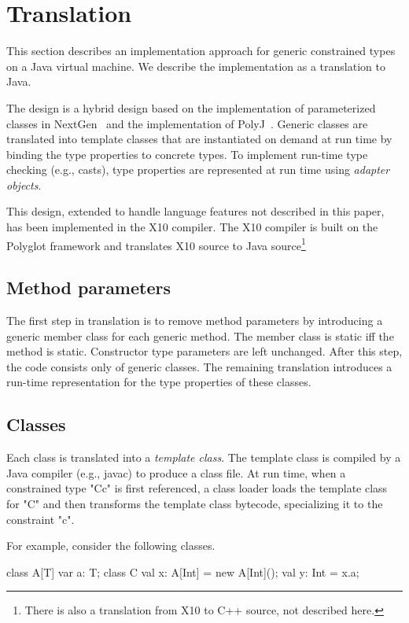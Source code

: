 \documentclass[preprint,nocopyrightspace,9pt]{sigplanconf}
\begin{document}
\section{Translation}

This section describes an implementation approach for
generic constrained types on a Java virtual machine.
We describe the implementation as a translation to Java.

The design
is a hybrid design based on the implementation of parameterized classes in
NextGen~\cite{allen03,allen04} and the implementation of
PolyJ~\cite{polyj}.
Generic classes are translated into template classes
that are instantiated on demand at run time by binding the type properties
to concrete types.  To implement run-time type checking (e.g.,
casts), type properties are represented at run time
using \emph{adapter objects}.

This design, extended to handle language features
not described in this paper, has been implemented in the X10
compiler.  The X10 compiler is built on the Polyglot framework
and translates X10 source to Java source\footnote{There is also
a translation from X10 to C++ source, not described here.}

\subsection{Method parameters}

The first step in translation is to remove method parameters by
introducing a generic member class for each generic method.
The member class is static iff the method is static.
Constructor type parameters are left unchanged.
After this step, the code consists only of generic classes.
The remaining translation introduces a run-time representation
for the type properties of these classes.

\subsection{Classes}

Each class is translated into a \emph{template class}.
The template class is compiled by a Java compiler (e.g., javac)
to produce a class file.
At run time, when a constrained type \xcd"C{c}" is first referenced, a
class loader loads the template class for \xcd"C" and then transforms the
template class bytecode, specializing it to the constraint
\xcd"c".

For example, consider the following classes.
\begin{xten}
class A[T] {
    var a: T;
}
class C {
    val x: A[Int] = new A[Int]();
    val y: Int = x.a;
}
\end{xten}
\end{document}

